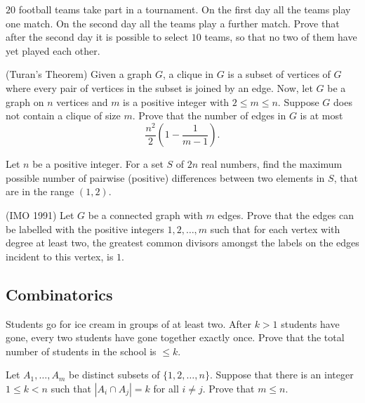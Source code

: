 \documentclass[12pt]{article}
\begin{document}
        \begin{exercise}
        $20$ football teams take part in a tournament. On the first day all the teams play one match. On the second day all the teams play a further match. Prove that after the second day it is possible to select $10$ teams, so that no two of them have yet played each other.
        \end{exercise}
        
        \begin{exercise}(Turan's Theorem)
        Given a graph $G$, a clique in $G$ is a subset of vertices of $G$ where every pair of vertices in the subset is joined by an edge. Now, let $G$ be a graph on $n$ vertices and $m$ is a positive integer with $2 \leq m \leq n$. Suppose $G$ does not contain a clique of size $m$. Prove that the number of edges in $G$ is at most 
        \[\frac{n^{2}}{2}\left(1 - \frac{1}{m - 1}\right).\]
        \end{exercise}
        
        \begin{exercise}
        Let $n$ be a positive integer. For a set $S$ of $2n$ real numbers, find the maximum possible number of pairwise (positive) differences between two elements in $S$, that are in the range $(1, 2)$.
        \end{exercise}
        
        \begin{exercise}(IMO 1991)
        Let $G$ be a connected graph with $m$ edges. Prove that the edges can be labelled with the positive integers $1, 2, \ldots, m$ such that for each vertex with degree at least two, the greatest common divisors amongst the labels on the edges incident to this vertex, is $1$.
        \end{exercise}

    \subsection{Combinatorics}

        \begin{exercise}
            Students go for ice cream in groups of at least two. After $k>1$ students have gone, every two students have gone together exactly once. Prove that the total number of students in the school is $\leq k$.
        \end{exercise}

        \begin{exercise}
            Let $A_1,\dots,A_m$ be distinct subsets of $\{1,2,\dots,n\}$. Suppose that there is an integer $1\leq k< n$ such that $|A_i\cap A_j|=k$ for all $i\neq j$. Prove that $m\leq n$.
        \end{exercise}
            
\end{document}
